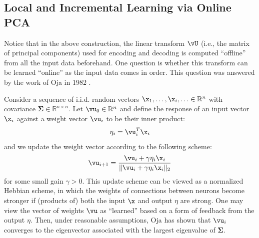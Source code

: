 \documentclass[../../book-main.tex]{subfiles}
\begin{document}
\subsection{Local and Incremental Learning via Online PCA}
Notice that in the above construction, the
linear transform $\vU$ (i.e., the matrix of principal components)
used for encoding and decoding is computed ``offline'' from all
the input data beforehand. One question is whether this transform
can be learned ``online'' as the input data comes in order. This
question was answered by the work of Oja in 1982 \cite{Oja1982SimplifiedNM}.
\begin{example} Consider a
    sequence of i.i.d. random vectors $\x_1, \ldots, \x_i, \ldots \in
    \mathbb{R}^n$ with covariance $\boldsymbol{\Sigma} \in
    \mathbb{R}^{n\times n}$. Let $\vu_0 \in \mathbb{R}^n$ and define
    the response of an input vector $\x_i$ against a weight vector
    $\vu_i$ to be their inner product:
    \begin{equation}
        \eta_i = \vu_i^T \x_i
    \end{equation}
    and we update the weight vector according to the following scheme:
    \begin{equation}
        \vu_{i+1} = \frac{\vu_i + \gamma \eta_i \x_i}{\|\vu_i + \gamma
        \eta_i \x_i\|_2}
        \label{eqn:Hebbian}
    \end{equation}
    for some small gain $\gamma >0$. This update scheme can be viewed
    as a normalized Hebbian scheme, in which the weights of connections
    between neurons become stronger if (products of) both the input
    $\x$ and output $\eta$ are strong. One may view the vector of
    weights $\vu$ as ``learned'' based on a form of feedback from the
    output $\eta$.
    Then, under reasonable assumptions, Oja \cite{Oja1982SimplifiedNM} has
    shown that $\vu_i$ converges to the eigenvector associated with
    the largest eigenvalue of $\boldsymbol{\Sigma}$.
\end{example}
\end{document}
